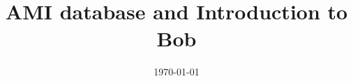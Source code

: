 \documentclass{beamer}
\begin{document}
\title[AMI and Bob]{AMI database and Introduction to Bob} 


\date{\today} 
\frame{\titlepage} %





\end{document}
